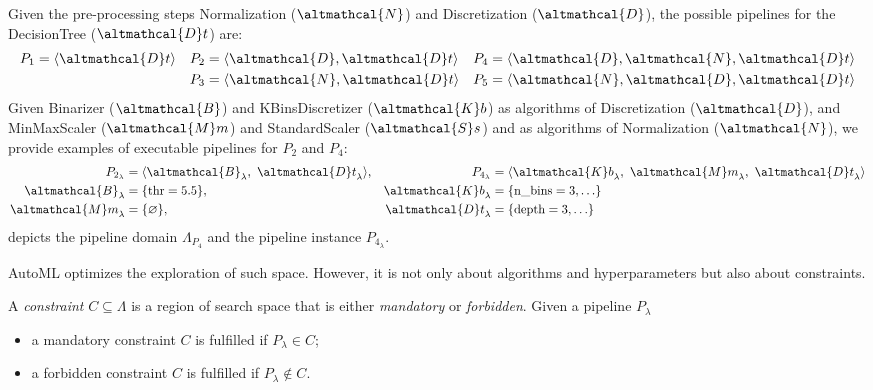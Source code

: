 \begin{example}[ML Pipelines]
    Given the pre-processing steps Normalization ($\altmathcal{N}$) and Discretization ($\altmathcal{D}$), the possible pipelines for the DecisionTree ($\altmathcal{D}t$) are:
    \begin{align*}
        P_1 &= \langle \altmathcal{D}t \rangle &
        P_2 &= \langle \altmathcal{D}, \altmathcal{D}t \rangle &
        P_4 &= \langle \altmathcal{D}, \altmathcal{N}, \altmathcal{D}t \rangle \\
        &&
        P_3 &= \langle \altmathcal{N}, \altmathcal{D}t \rangle & P_5 &= \langle \altmathcal{N}, \altmathcal{D}, \altmathcal{D}t \rangle
    \end{align*}
    Given \textup{Binarizer} ($\altmathcal{B}$) and  \textup{KBinsDiscretizer} ($\altmathcal{K}b$) as algorithms of Discretization ($\altmathcal{D}$), and \textup{MinMaxScaler} ($\altmathcal{M}m$) and \textup{StandardScaler} ($\altmathcal{S}s$) and  as algorithms of Normalization ($\altmathcal{N}$), we provide examples of executable pipelines for $P_2$ and $P_4$:
    \begin{align*}
        P_{2_{\lambda}} &= \langle {\altmathcal{B}}_{\lambda},~  {\altmathcal{D}t}_{\lambda}\rangle, & P_{4_{\lambda}} &= \langle {\altmathcal{K}b}_{\lambda},~ {\altmathcal{M}m}_{\lambda},~ {\altmathcal{D}t}_{\lambda} \rangle \\
        {\altmathcal{B}}_{\lambda} &=\{ \textup{thr}=5.5 \}, &{\altmathcal{K}b}_{\lambda} &=\{ \textup{n\_bins}=3, \ldots \}\\
        {\altmathcal{M}m}_{\lambda} &=\{ \varnothing \}, &{\altmathcal{D}t}_{\lambda}&= \{ \textup{depth}=3,\ldots\}
    \end{align*}
     depicts the pipeline domain $\Lambda_{P_4}$ and the pipeline instance $P_{4_{\lambda}}$.
    \label{ex:pipelineinstance}
\end{example}

AutoML optimizes the exploration of such space.
However, it is not only about algorithms and hyperparameters but also about constraints.

\begin{definition}[Constraint]\label{constraints}
A \emph{constraint} $C \subseteq \Lambda$ is a region of search space that is either \emph{mandatory} or \emph{forbidden}.
Given a pipeline $P_{\lambda}$
\begin{itemize}
    \item a mandatory constraint $C$ is fulfilled if  $P_{\lambda} \in C$;
    \item a forbidden constraint $C$ is fulfilled if  $P_{\lambda} \notin C$.
\end{itemize}
\end{definition}

